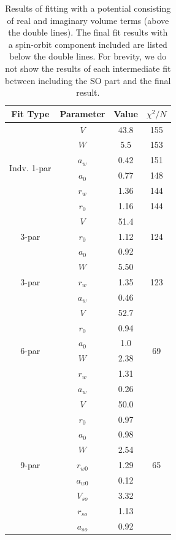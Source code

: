 \documentclass[]{scrartcl}
\begin{document}


\begin{table}
\centering
	\begin{tabular}{ c | c | c | c }
	Fit Type & Parameter & Value & $\chi ^2 / N$\\
\hline
	\multirow{6}{*}{Indv. 1-par} & $V$ & 43.8 & 155 \\
	& $W$ & 5.5 & 153 \\
	& $a _w$ & 0.42 & 151\\
	& $a _0$ & 0.77 & 148\\
	& $r _w$ & 1.36 & 144 \\
	& $r _0$ & 1.16 & 144 \\
\hline
	\multirow{3}{*}{3-par} & $V$ & 51.4 & \multirow{3}{*}{124} \\
	& $r_0$ & 1.12 & \\
	& $a_0$ & 0.92 & \\
\hline
	\multirow{3}{*}{3-par} & $W$ & 5.50 & \multirow{3}{*}{123}\\
	& $r_{w}$ &1.35 & \\
	& $a_w$ & 0.46 & \\
\hline
	\multirow{6}{*}{6-par} & $V$ & 52.7 &  \multirow{6}{*}{69} \\
	& $r_0$ & 0.94  &\\
	& $a_0$ & 1.0  &\\
	& $W$ & 2.38 & \\
	& $r_w$ & 1.31  &\\
	& $a_w$ & 0.26  &\\
\hline
\hline
	\multirow{9}{*}{9-par} & $V$ & 50.0 & \multirow{9}{*}{65}\\
	& $ r_{0} $& 0.97 & \\
	& $ a_{0}$ & 0.98 & \\
	& $W$ & 2.54 & \\
	& $ r _{w0}$ & 1.29 & \\
	& $ a _{w0}$ & 0.12 & \\
	& $ V_{so}$ & 3.32 & \\
	& $ r _{so}$ & 1.13 & \\
	& $ a _{so}$ & 0.92 & \\
\hline
	\end{tabular}
	\caption{Results of fitting with a potential consisting of real and imaginary volume terms (above the double lines). The final fit results with a spin-orbit component included are listed below the double lines. For brevity, we do not show the results of each intermediate fit between including the SO part and the final result.}
	\label{tab:fitvol}
\end{table}
\end{document}
